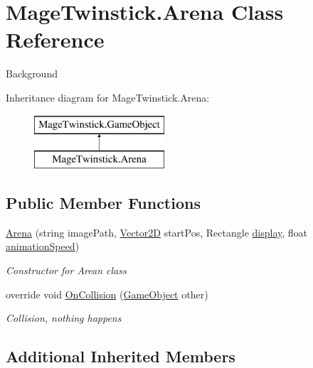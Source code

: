 \hypertarget{class_mage_twinstick_1_1_arena}{}\section{Mage\+Twinstick.\+Arena Class Reference}
\label{class_mage_twinstick_1_1_arena}


Background  


Inheritance diagram for Mage\+Twinstick.\+Arena\+:\begin{figure}[H]
\begin{center}
\leavevmode
\includegraphics[height=2.000000cm]{class_mage_twinstick_1_1_arena}
\end{center}
\end{figure}
\subsection*{Public Member Functions}
\begin{DoxyCompactItemize}
\item 
\hyperlink{class_mage_twinstick_1_1_arena_aace14406dc02031e9739a08e5be7301b}{Arena} (string image\+Path, \hyperlink{class_mage_twinstick_1_1_vector2_d}{Vector2\+D} start\+Pos, Rectangle \hyperlink{class_mage_twinstick_1_1_game_object_a5807df7f837dc87c8955a008d0b27b50}{display}, float \hyperlink{class_mage_twinstick_1_1_game_object_a5d21c31402c27c5a19f2a62d98720456}{animation\+Speed})
\begin{DoxyCompactList}\small\item\em Constructor for Arean class \end{DoxyCompactList}\item 
override void \hyperlink{class_mage_twinstick_1_1_arena_a12cdc5acc58ee006eb0b5a47507934fc}{On\+Collision} (\hyperlink{class_mage_twinstick_1_1_game_object}{Game\+Object} other)
\begin{DoxyCompactList}\small\item\em Collision, nothing happens \end{DoxyCompactList}\end{DoxyCompactItemize}
\subsection*{Additional Inherited Members}


